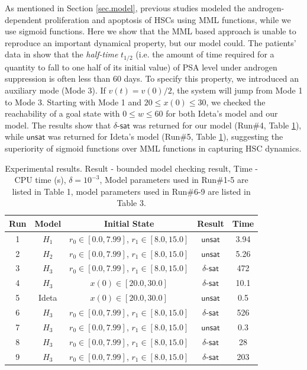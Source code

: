 As mentioned in Section \ref{sec.model}, previous studies \cite{jackson04a,jackson04b,ideta08} modeled the androgen-dependent proliferation and apoptosis of HSCs using MML functions, while we use sigmoid functions. Here we show that the MML based approach is unable to reproduce an important dynamical property, but our model could. The patients' data in \cite{ bruchovsky06,bruchovsky07} show that the \textit{half-time} $t_{1/2}$ (i.e. the amount of time required for a quantity to fall to one half of its initial value) of PSA level under androgen suppression is often less than $60$ days. To specify this property, we introduced an auxiliary mode (Mode 3). If $v(t)=v(0)/2$, the system will jump from Mode 1 to Mode 3. Starting with Mode 1 and $20 \le x(0) \le 30$, we checked the reachability of a goal state with $0 \le w \le 60$ for both Ideta's model \cite{ideta08} and our model. The results show that  $\delta$-$\mathsf{sat}$ was returned for our model (Run\#4, Table \ref{runs}), while $\mathsf{unsat}$ was returned for Ideta's model (Run\#5, Table \ref{runs}), suggesting the superiority of sigmoid functions over MML functions in capturing HSC dynamics.




\begin{table}[!th]
  \centering
  \small
  \begin{tabular}{|c|c|c|c|c|}
    \hline
    \hline
    Run & Model & Initial State   & Result   & Time   \\
    \hline
    \hline
    1 & $H_1$ & $r_0 \in [0.0,7.99]$, $r_1 \in [8.0,15.0]$  & $\mathsf{unsat}$  &  3.94 \\
    2 & $H_2$ & $r_0 \in [0.0,7.99]$, $r_1 \in [8.0,15.0]$   & $\mathsf{unsat}$  &  5.26 \\
    3 & $H_3$ & $r_0 \in [0.0,7.99]$, $r_1 \in [8.0,15.0]$   & $\delta$-$\mathsf{sat}$ &  472 \\ 
    4 & $H_3$ & $x(0) \in [20.0,30.0]$   & $\delta$-$\mathsf{sat}$ &  10.1 \\
    5 & Ideta & $x(0) \in [20.0,30.0]$   & $\mathsf{unsat}$ &  0.5 \\           
    6 & $H_3$ & $r_0 \in [0.0,7.99]$, $r_1 \in [8.0,15.0]$   & $\delta$-$\mathsf{sat}$ &  526 \\ 
    7 & $H_3$ & $r_0 \in [0.0,7.99]$, $r_1 \in [8.0,15.0]$   & $\mathsf{unsat}$ &  0.3 \\ 
    8 & $H_3$ & $r_0 \in [0.0,7.99]$, $r_1 \in [8.0,15.0]$   & $\delta$-$\mathsf{sat}$ &  28 \\ 
    9 & $H_3$ & $r_0 \in [0.0,7.99]$, $r_1 \in [8.0,15.0]$   & $\delta$-$\mathsf{sat}$ & 203 \\ 
    \hline
    \hline
  \end{tabular}
  \caption{\small
  Experimental results.
    Result - bounded model checking result,
    Time - CPU time (s),
    $\delta=10^{-3}$,
    Model parameters used in Run\#1-5 are listed in Table 1,  model parameters used in Run\#6-9 are listed in Table 3.
}\label{runs}
 \vspace{-0.3cm}
\end{table}


